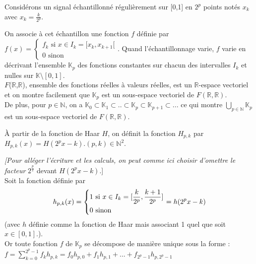 \documentclass{article}
\begin{document}
Considérons un signal échantillonné régulièrement sur [0,1] en $2^p$ points notés $x_{k}$ avec $x_{k} = \frac{k}{2^p}$.

On associe à cet échantillon une fonction $f$ définie par $f(x) = \begin{cases}
     f_{k} \text{ si } x \in I_{k} = [x_{k},x_{k+1}[\\
     0 \text{ sinon }
   \end{cases}$.
Quand l'échantillonnage varie, $f$ varie en décrivant l'ensemble $\mathbb{K}_{p}$ des fonctions constantes sur chacun des intervalles $I_{k}$ et nulles sur $\mathbb{K} \setminus [0,1]$. \\

$F$($\mathbb{R}$,$\mathbb{R}$), ensemble des fonctions réelles à valeurs réelles, est un $\mathbb{R}$-espace vectoriel et on montre facilement que $\mathbb{K}_{p}$ est un sous-espace vectoriel de $F(\mathbb{R},\mathbb{R})$. \\

De plus, pour $p \in \mathbb{N}$, on a $\mathbb{K}_{0} \subset \mathbb{K}_{1} \subset .. \subset \mathbb{K}_{p} \subset \mathbb{K}_{p+1} \subset ... $ ce qui montre $\bigcup\limits_{p \in \mathbb{N}}\mathbb{K}_{p}$ est un sous-espace vectoriel de $F(\mathbb{R},\mathbb{R})$.

\uppercase{à} partir de la fonction de Haar $H$, on définit la fonction $H_{p,k}$ par $H_{p,k}(x) = H(2^{p}x - k). (p,k) \in \mathbb{N}^2$.

\textit{[Pour alléger l’écriture et les calculs, on peut comme ici choisir d’omettre le facteur }$2^\frac{p}{2}$ devant $ H(2^{p}x - k)$.] \\

Soit la fonction définie par \[
 h_{p,k}(x) = \begin{dcases*}
        1 \text{ si } x \in I_{k} = [\frac{k}{2^p},\frac{k+1}{2^p}] \\ 
        0 \text{ sinon }
        \end{dcases*}
 = h(2^{p}x - k) \] (avec $h$ définie comme la fonction de Haar mais associant 1 quel que soit $x \in [0,1]$.). \\

Or toute fonction $f$ de $\mathbb{K}_{p}$ se décompose de manière unique sous la forme : \\

$\displaystyle f = \sum_{k = 0}^{2^p - 1} f_{k}h_{p,k} = f_{0}h_{p,0} + f_{1}h_{p,1} + ... + f_{2^p - 1}h_{p,2^p - 1}$ \\
\end{document}

